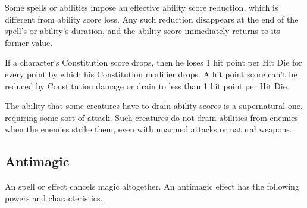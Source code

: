 Some spells or abilities impose an effective ability score reduction, which is 
different from ability score loss. Any such reduction disappears at the end of 
the spell's or ability's duration, and the ability score immediately returns to 
its former value.

If a character's Constitution score drops, then he loses 1 hit point per Hit Die 
for every point by which his Constitution modifier drops. A hit point score can't 
be reduced by Constitution damage or drain to less than 1 hit point per Hit Die.

The ability that some creatures have to drain ability scores is a supernatural 
one, requiring some sort of attack. Such creatures do not drain abilities from 
enemies when the enemies strike them, even with unarmed attacks or natural weapons.

\subsection{Antimagic}

An  spell or effect cancels magic altogether. An antimagic 
effect has the following powers and characteristics.

